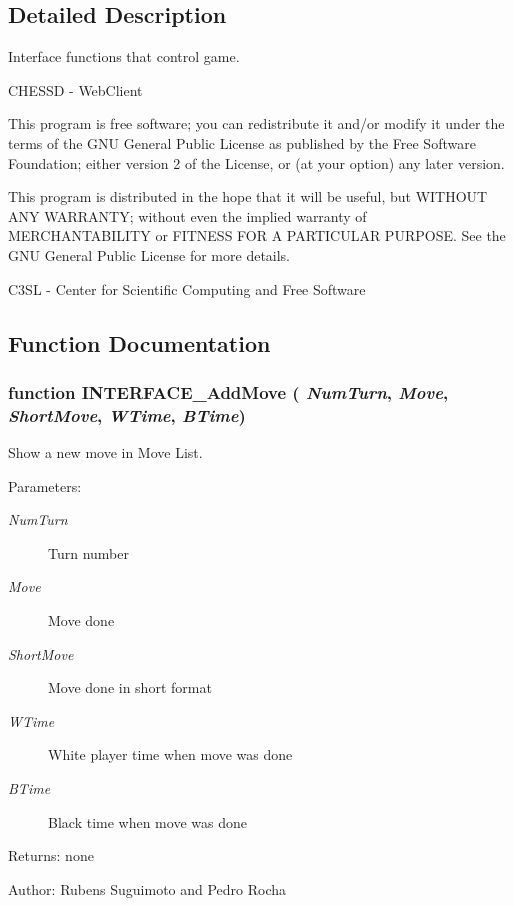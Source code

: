 \subsection{Detailed Description}
Interface functions that control game. 

CHESSD - WebClient

This program is free software; you can redistribute it and/or modify it under the terms of the GNU General Public License as published by the Free Software Foundation; either version 2 of the License, or (at your option) any later version.

This program is distributed in the hope that it will be useful, but WITHOUT ANY WARRANTY; without even the implied warranty of MERCHANTABILITY or FITNESS FOR A PARTICULAR PURPOSE. See the GNU General Public License for more details.

C3SL - Center for Scientific Computing and Free Software 

\subsection{Function Documentation}
\subsubsection[INTERFACE\_\-AddMove]{\setlength{\rightskip}{0pt plus 5cm}function INTERFACE\_\-AddMove ( {\em NumTurn}, \/   {\em Move}, \/   {\em ShortMove}, \/   {\em WTime}, \/   {\em BTime})}\label{interface_2game_8js_e189f8c155bbd7f0e25d31e5b76e420b}


Show a new move in Move List. 

\begin{Desc}
\item[Parameters:]
\begin{description}
\item[{\em NumTurn}]Turn number \item[{\em Move}]Move done \item[{\em ShortMove}]Move done in short format \item[{\em WTime}]White player time when move was done \item[{\em BTime}]Black time when move was done \end{description}
\end{Desc}
\begin{Desc}
\item[Returns:]none \end{Desc}
\begin{Desc}
\item[Author:]Rubens Suguimoto and Pedro Rocha \end{Desc}


